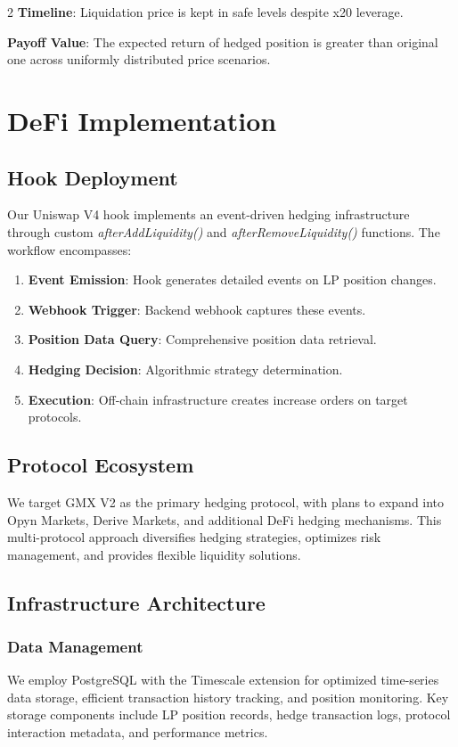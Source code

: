 \documentclass[10pt]{article}
\begin{document}
\begin{multicols}{2}
\smallskip
\textbf{Timeline}: Liquidation price is kept in safe levels despite x20 leverage.

\smallskip
\textbf{Payoff Value}: The expected return of hedged position is greater than original one across uniformly distributed price scenarios. 

\bigskip
\bigskip

\section{DeFi Implementation}

\subsection{Hook Deployment}
Our Uniswap V4 hook implements an event-driven hedging infrastructure through custom \textit{afterAddLiquidity()} and \textit{afterRemoveLiquidity()} functions. The workflow encompasses:
\begin{enumerate}
	\item \textbf{Event Emission}: Hook generates detailed events on LP position changes.
	\item \textbf{Webhook Trigger}: Backend webhook captures these events.
	\item \textbf{Position Data Query}: Comprehensive position data retrieval.
	\item \textbf{Hedging Decision}: Algorithmic strategy determination.
	\item \textbf{Execution}: Off-chain infrastructure creates increase orders on target protocols.
\end{enumerate}

\subsection{Protocol Ecosystem}
We target GMX V2 as the primary hedging protocol, with plans to expand into Opyn Markets, Derive Markets, and additional DeFi hedging mechanisms. This multi-protocol approach diversifies hedging strategies, optimizes risk management, and provides flexible liquidity solutions.

\subsection{Infrastructure Architecture}
\subsubsection{Data Management}
We employ PostgreSQL with the Timescale extension for optimized time-series data storage, efficient transaction history tracking, and position monitoring. Key storage components include LP position records, hedge transaction logs, protocol interaction metadata, and performance metrics.

\end{multicols}
\end{document}
